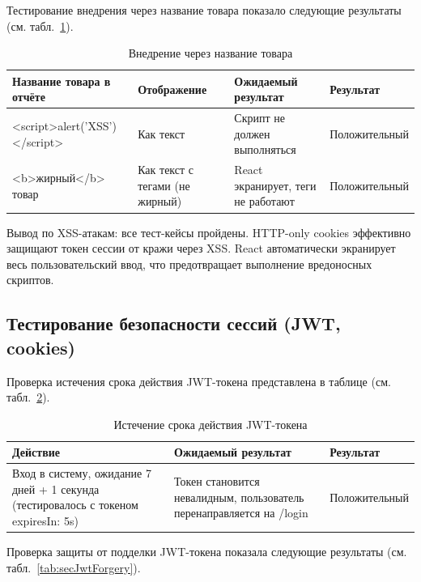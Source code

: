 Тестирование внедрения через название товара показало следующие результаты (см. табл.~\ref{tab:secXssProduct}).

\begin{table}[H]
\caption{\label{tab:secXssProduct}Внедрение через название товара}
\small
\begin{center}
\vspace{-0.5cm}\begin{tabular}{|p{5cm}|p{3cm}|p{4cm}|p{3cm}|}
\hline
Название товара в отчёте & Отображение & Ожидаемый результат & Результат \\ \hline
<script>alert('XSS') </script> & Как текст & Скрипт не должен выполняться & Положительный \\ \hline
<b>жирный</b> товар & Как текст с тегами (не жирный) & React экранирует, теги не работают & Положительный \\ \hline
\end{tabular}
\end{center}
\end{table}

Вывод по XSS-атакам: все тест-кейсы пройдены. HTTP-only cookies эффективно защищают токен сессии от кражи через XSS. React автоматически экранирует весь пользовательский ввод, что предотвращает выполнение вредоносных скриптов.

\subsection{Тестирование безопасности сессий (JWT, cookies)}
Проверка истечения срока действия JWT-токена представлена в таблице (см. табл.~\ref{tab:secJwtExpiry}).

\begin{table}[H]
\caption{\label{tab:secJwtExpiry}Истечение срока действия JWT-токена}
\small
\begin{center}
\vspace{-0.5cm}\begin{tabular}{|p{6cm}|p{6cm}|p{3cm}|}
\hline
Действие & Ожидаемый результат & Результат \\ \hline
Вход в систему, ожидание 7 дней + 1 секунда (тестировалось с токеном expiresIn: 5s) & Токен становится невалидным, пользователь перенаправляется на /login & Положительный \\ \hline
\end{tabular}
\end{center}
\end{table}

Проверка защиты от подделки JWT-токена показала следующие результаты (см. табл.~\ref{tab:secJwtForgery}).

